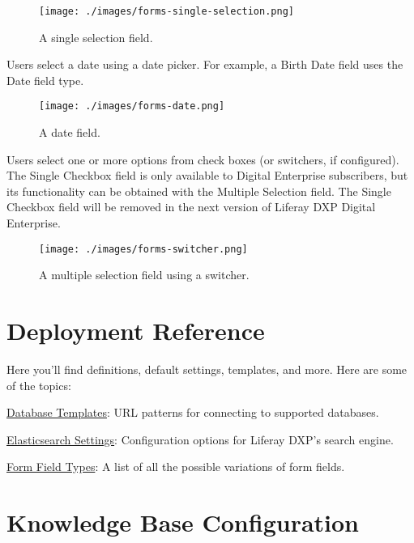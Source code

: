 \begin{figure}
\centering
\texttt{[image: ./images/forms-single-selection.png]}
\caption{A single selection field.}
\end{figure}

\begin{description}
\tightlist
\item[Date]
Users select a date using a date picker. For example, a Birth Date field
uses the Date field type.
\end{description}

\begin{figure}
\centering
\texttt{[image: ./images/forms-date.png]}
\caption{A date field.}
\end{figure}

\begin{description}
\tightlist
\item[Multiple Selection/Single Checkbox]
Users select one or more options from check boxes (or switchers, if
configured). The Single Checkbox field is only available to Digital
Enterprise subscribers, but its functionality can be obtained with the
Multiple Selection field. The Single Checkbox field will be removed in
the next version of Liferay DXP Digital Enterprise.
\end{description}

\begin{figure}
\centering
\texttt{[image: ./images/forms-switcher.png]}
\caption{A multiple selection field using a switcher.}
\end{figure}

\section{Deployment Reference}\label{deployment-reference}

Here you'll find definitions, default settings, templates, and more.
Here are some of the topics:

\href{/docs/7-0/deploy/-/knowledge_base/d/database-templates}{Database
Templates}: URL patterns for connecting to supported databases.

\href{/docs/7-0/deploy/-/knowledge_base/d/elasticsearch-settings}{Elasticsearch
Settings}: Configuration options for Liferay DXP's search engine.

\href{/docs/7-0/deploy/-/knowledge_base/d/form-field-types}{Form Field
Types}: A list of all the possible variations of form fields.

\section{Knowledge Base
Configuration}\label{knowledge-base-configuration}

